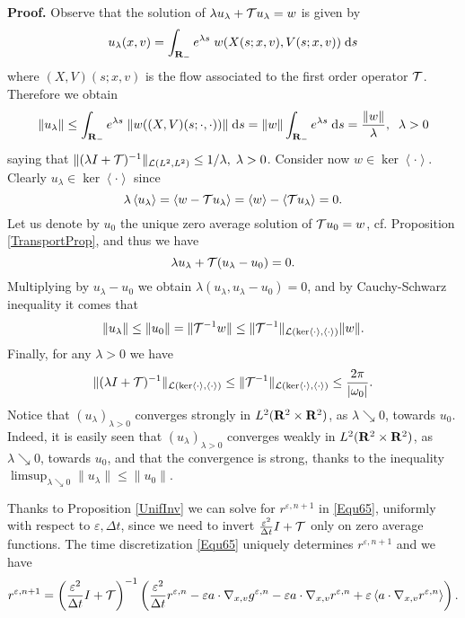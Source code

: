 \documentclass[12pt, a4paper]{article}
\newcommand{\red}{\textcolor{red!95!black}}
\providecommand\mathbb{\bf}
\newcommand\R{{\mathbb R}}
\newcounter{steps}
\newenvironment{proof}[1][]{%
\par\medbreak\setcounter{steps}{0}
{\noindent\bfseries Proof#1. }} {\hfill\fbox{\ }\medbreak}
\newcommand{\eps}[0]{
\varepsilon}
\newcommand{\ren}[0]{
r ^{\varepsilon, n}}
\newcommand{\renpo}[0]{
r ^{\varepsilon, n + 1}}
\newcommand{\gen}[0]{
g ^{\varepsilon, n}}
\newcommand{\ltxv}[0]{
L^2(\R ^2 \times \R ^2)}
\newcommand{\nxv}[0]{
\nabla_{x,v}}
\newcommand{\ave}[1]{
\left \langle #1 \right \rangle }
\begin{document}
\begin{proof}
\red{Observe that the solution of $\lambda u_\lambda + {\cal T}u_\lambda = w$ is given by
\begin{equation}
\label{Equ67}
u_\lambda(x,v) = \int _{\R_-} e ^ {\lambda s} \;w (X(s;x,v), V(s;x,v))\;\mathrm{d}s
\end{equation}
where $(X,V)(s;x,v)$ is the flow associated to the first order operator ${\cal T}$. Therefore we obtain
\[
\|u_\lambda\| \leq \int _{\R_ -} e ^ {\lambda s}\;\|w((X,V)(s;\cdot,\cdot))\|\;\mathrm{d}s = \|w\| \int _{\R_ -} e ^ {\lambda s}\;\mathrm{d}s =\frac{\|w\|}{\lambda},\;\;\lambda >0
\]
saying that $\|(\lambda I + {\cal T})^{-1} \|_{{\cal L}(L^2, L^2)} \leq 1/\lambda,\; \lambda >0$. Consider now $w \in \ker \ave{\cdot}$. Clearly $u_\lambda \in \ker \ave{\cdot}$ since
\[
\lambda \ave{u_\lambda} = \ave{w - {\cal T}u_\lambda} = \ave{w} - \ave{{\cal T}u_\lambda } = 0.
\]
Let us denote by $u_0$ the unique zero average solution of ${\cal T} u_0 = w$, cf. Proposition \ref{TransportProp}, and thus we have
\[
\lambda u_\lambda + {\cal T} (u_\lambda - u_0) = 0.
\]
Multiplying by $u_\lambda-u_0$ we obtain $\lambda (u_\lambda, u_\lambda -u_0) = 0$, and by Cauchy-Schwarz inequality it comes that
\[
\|u_\lambda \| \leq \| u_0 \| = \|{\cal T} ^{-1} w \| \leq \|{\cal T}^{-1}\|_{{\cal L} ( \ker \ave{\cdot}, \ave{\cdot})} \|w\|.
\]
Finally, for any $\lambda >0$ we have
\[
\| (\lambda I + {\cal T} ) ^{-1}\|_{{\cal L} ( \ker \ave{\cdot}, \ave{\cdot})} \leq \|{\cal T}^{-1} \|_{{\cal L} ( \ker \ave{\cdot}, \ave{\cdot})} \leq \frac{2\pi}{|\omega _0|}.
\]
Notice that $(u_\lambda)_{\lambda >0}$ converges strongly in $\ltxv{}$, as $\lambda \searrow 0$, towards $u_0$. Indeed, it is easily seen that $(u_\lambda)_{\lambda >0}$ converges weakly in $\ltxv{}$, as $\lambda \searrow 0$, towards $u_0$, and that the convergence is strong, thanks to the inequality $\limsup _{\lambda \searrow 0} \|u _\lambda\| \leq \|u_0\|$.
}

\end{proof}
Thanks to Proposition \ref{UnifInv} we can solve for $\renpo$ in \eqref{Equ65}, uniformly with respect to $\eps, \Delta t$, since we need to invert $\frac{\eps ^2}{\Delta t} I + {\cal T}$ only on zero average functions. The time discretization \eqref{Equ65} uniquely determines $\renpo{}$ and we have
\begin{equation}
\label{Equ68} \renpo = \left ( \frac{\eps ^2}{\Delta t } I + {\cal T} \right ) ^{-1} \left (\frac{\eps ^2}{\Delta t} \ren - \eps a \cdot \nxv \gen - \eps a \cdot \nxv \ren + \eps \ave{a \cdot \nxv \ren }     \right ).
\end{equation}
\end{document}

